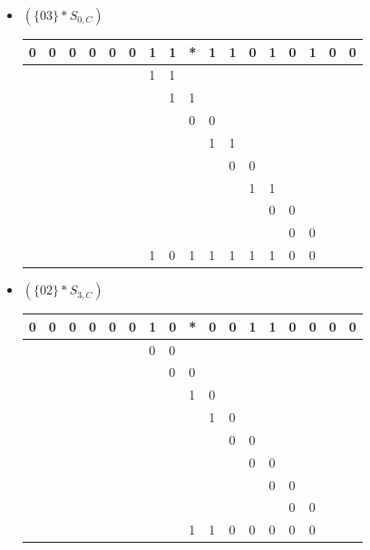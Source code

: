 \begin{itemize}
     \begin{itemize}
        \item $(\{03\} * S_{0,C})$
\begin{center}
\begin{tabular}{lllllllllllllllll}
0 & 0 & 0 & 0 & 0 & 0 & 1 & 1 & * & 1 & 1 & 0 & 1 & 0 & 1 & 0 & 0\\
\hline
 &  &  &  &  &  & 1 & 1 &  &  &  &  &  &  &  &  & \\
 &  &  &  &  &  &  & 1 & 1 &  &  &  &  &  &  &  & \\
 &  &  &  &  &  &  &  & 0 & 0 &  &  &  &  &  &  & \\
 &  &  &  &  &  &  &  &  & 1 & 1 &  &  &  &  &  & \\
 &  &  &  &  &  &  &  &  &  & 0 & 0 &  &  &  &  & \\
 &  &  &  &  &  &  &  &  &  &  & 1 & 1 &  &  &  & \\
 &  &  &  &  &  &  &  &  &  &  &  & 0 & 0 &  &  & \\
 &  &  &  &  &  &  &  &  &  &  &  &  & 0 & 0 &  & \\
 \hline
 &  &  &  &  &  & 1 & 0 & 1 & 1 & 1 & 1 & 1 & 0 & 0 &  & \\
         \end{tabular}
         \end{center}

        \item $(\{02\} * S_{3,C})$
\begin{center}
\begin{tabular}{lllllllllllllllll}
0 & 0 & 0 & 0 & 0 & 0 & 1 & 0 & * & 0 & 0 & 1 & 1 & 0 & 0 & 0 & 0\\
\hline
 &  &  &  &  &  & 0 & 0 &  &  &  &  &  &  &  &  & \\
 &  &  &  &  &  &  & 0 & 0 &  &  &  &  &  &  &  & \\
 &  &  &  &  &  &  &  & 1 & 0 &  &  &  &  &  &  & \\
 &  &  &  &  &  &  &  &  & 1 & 0 &  &  &  &  &  & \\
 &  &  &  &  &  &  &  &  &  & 0 & 0 &  &  &  &  & \\
 &  &  &  &  &  &  &  &  &  &  & 0 & 0 &  &  &  & \\
 &  &  &  &  &  &  &  &  &  &  &  & 0 & 0 &  &  & \\
 &  &  &  &  &  &  &  &  &  &  &  &  & 0 & 0 &  & \\
 \hline
 &  &  &  &  &  &  &  & 1 & 1 & 0 & 0 & 0 & 0 & 0 &  & \\
         \end{tabular}
         \end{center}


\end{itemize}
\end{itemize}
